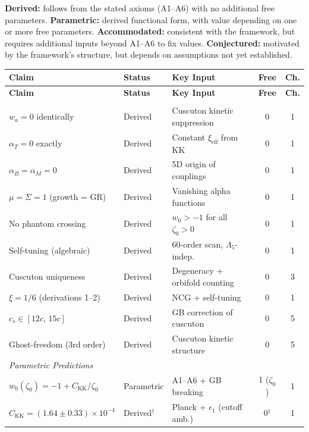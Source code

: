 \documentclass[10pt,a4paper,openany,twocolumn]{book}
\theoremstyle{definition}
\theoremstyle{remark}
\begin{document}
\medskip

\noindent
\textbf{Derived:} follows from the stated axioms (A1--A6) with no additional free parameters.
\textbf{Parametric:} derived functional form, with value depending on one or more free parameters.
\textbf{Accommodated:} consistent with the framework, but requires additional inputs beyond A1--A6 to fix values.
\textbf{Conjectured:} motivated by the framework's structure, but depends on assumptions not yet established.

\begin{center}
\small
\begin{longtable}{p{4.8cm} l p{4.2cm} c c}
\hline
\textbf{Claim} & \textbf{Status} & \textbf{Key Input} & \textbf{Free} & \textbf{Ch.} \\
\hline
\endfirsthead
\hline
\textbf{Claim} & \textbf{Status} & \textbf{Key Input} & \textbf{Free} & \textbf{Ch.} \\
\hline
\endhead
\hline
\endfoot
\multicolumn{5}{l}{\emph{Core Cosmological Framework (Chapters~\ref{ch:foundation}, \ref{ch:nogo}, \ref{ch:sound-speed})}} \\[3pt]
$w_a = 0$ identically & Derived & Cuscuton kinetic suppression & 0 & 1 \\
$\alpha_T = 0$ exactly & Derived & Constant $\xi_\mathrm{eff}$ from KK & 0 & 1 \\
$\alpha_B = \alpha_M = 0$ & Derived & 5D origin of couplings & 0 & 1 \\
$\mu = \Sigma = 1$ (growth = GR) & Derived & Vanishing alpha functions & 0 & 1 \\
No phantom crossing & Derived & $w_0 > -1$ for all $\zeta_0 > 0$ & 0 & 1 \\
Self-tuning (algebraic) & Derived & 60-order scan, $\Lambda_5$-indep. & 0 & 1 \\
Cuscuton uniqueness & Derived & Degeneracy + orbifold counting & 0 & 3 \\
$\xi = 1/6$ (derivations 1--2) & Derived & NCG + self-tuning & 0 & 1 \\
$c_s \in [12c,\, 15c]$ & Derived & GB correction of cuscuton & 0 & 5 \\
Ghost-freedom (3rd order) & Derived & Cuscuton kinetic structure & 0 & 5 \\[6pt]
\multicolumn{5}{l}{\emph{Parametric Predictions}} \\[3pt]
$w_0(\zeta_0) = -1 + C_\mathrm{KK}/\zeta_0$ & Parametric & A1--A6 + GB breaking & 1 ($\zeta_0$) & 1 \\
$C_\mathrm{KK} = (1.64 \pm 0.33) \times 10^{-4}$ & Derived$^\dag$ & Planck + $\epsilon_1$ (cutoff amb.) & 0$^\dag$ & 1 \\

\end{longtable}
\end{center}
\end{document}
